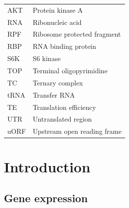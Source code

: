 \documentclass[
  12pt,
  openany]{book}
\begin{document}
\begin{tabular}{ll}
AKT & Protein kinase A\\
RNA & Ribonucleic acid\\
RPF & Ribosome protected fragment\\
RBP & RNA binding protein\\
S6K & S6 kinase\\
TOP & Terminal oligopyrimidine\\
TC & Ternary complex\\
tRNA & Transfer RNA\\
TE & Translation efficiency\\
UTR & Untranslated region\\
uORF & Upstream open reading frame\\
\bottomrule
\end{tabular}
\clearpage
{}

\setcounter{page}{1}

\chapter{Introduction}
\section{Gene expression}
\end{document}
